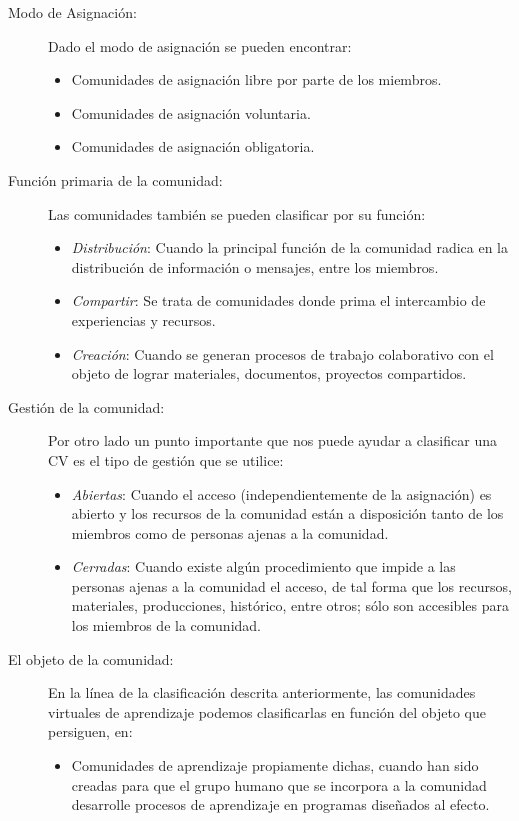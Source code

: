 \begin{description}
\item[Modo de Asignación: ]
Dado el modo de asignación se pueden encontrar:
\begin{itemize}
\item Comunidades de asignación libre por parte de los miembros.
\item Comunidades de asignación voluntaria.
\item Comunidades de asignación obligatoria.
\end{itemize}
\item[Función primaria de la comunidad: ]
Las comunidades también se pueden clasificar por su función:
\begin{itemize}
\item \emph{Distribución}: Cuando la principal función de la comunidad radica en la distribución de información o mensajes, entre los miembros.
\item \emph{Compartir}: Se trata de comunidades donde prima el intercambio de experiencias y recursos.
\item \emph{Creación}: Cuando se generan procesos de trabajo colaborativo con el objeto de lograr materiales, documentos, proyectos compartidos.
\end{itemize}
\item[Gestión de la comunidad: ]
Por otro lado un punto importante que nos puede ayudar a clasificar una CV es el tipo de gestión que se utilice:
\begin{itemize}
\item \emph{Abiertas}: Cuando el acceso (independientemente de la asignación) es abierto y los recursos de la comunidad están a disposición tanto de los miembros como de personas ajenas a la comunidad.
\item \emph{Cerradas}: Cuando existe algún procedimiento que impide a las personas ajenas a la comunidad el acceso, de tal forma que los recursos, materiales, producciones, histórico, entre otros; sólo son accesibles para los miembros de la comunidad.
\end{itemize}
\item[El objeto de la comunidad: ]
En la línea de la clasificación descrita anteriormente, las comunidades virtuales de aprendizaje podemos clasificarlas en función del objeto que persiguen, en:
\begin{itemize}
\item Comunidades de aprendizaje propiamente dichas, cuando han sido creadas para que el grupo humano que se incorpora a la comunidad desarrolle procesos de aprendizaje en programas diseñados al efecto.

\end{itemize}
\end{description}
